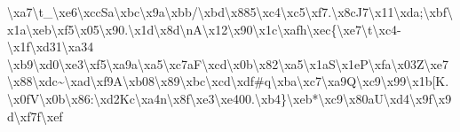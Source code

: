 \documentclass[11pt]{article}
\begin{document}
\textbackslash{}xa7\textbackslash{}t\_\textbackslash{}xe6\textbackslash{}xccSa\textbackslash{}xbc\textbackslash{}x9a\textbackslash{}xbb/\textbackslash{}xbd\textbackslash{}x885\textbackslash{}xc4\textbackslash{}xc5\textbackslash{}xf7.\textbackslash{}x8cJ7\textbackslash{}x11\textbackslash{}xda;\textbackslash{}xbf\textbackslash{}x1a\textbackslash{}xeb\textbackslash{}xf5\textbackslash{}x05\textbackslash{}x90.\textbackslash{}x1d\textbackslash{}x8d\textbackslash{}nA\textbackslash{}x12\textbackslash{}x90\textbackslash{}x1c\textbackslash{}xafh\textbackslash{}xec\{\textbackslash{}xe7\textbackslash{}t\textbackslash{}xc4-\textbackslash{}x1f\textbackslash{}xd31\textbackslash{}xa34 \textbackslash{}xb9\textbackslash{}xd0\textbackslash{}xe3\textbackslash{}xf5\textbackslash{}xa9a\textbackslash{}xa5\textbackslash{}xc7aF\textbackslash{}xcd\textbackslash{}x0b\textbackslash{}x82\textbackslash{}xa5\textbackslash{}x1aS\textbackslash{}x1eP\textbackslash{}xfa\textbackslash{}x03Z\textbackslash{}xe7\textbackslash{}x88\textbackslash{}xdc\textasciitilde{}\textbackslash{}xad\textbackslash{}xf9A\textbackslash{}xb08\textbackslash{}x89\textbackslash{}xbc\textbackslash{}xcd\textbackslash{}xdf\#q\textbackslash{}xba\textbackslash{}xc7\textbackslash{}xa9Q\textbackslash{}xc9\textbackslash{}x99\textbackslash{}x1b[K.\textbackslash{}x0fV\textbackslash{}x0b\textbackslash{}x86:\textbackslash{}xd2Kc\textbackslash{}xa4n\textbackslash{}x8f\textbackslash{}xe3\textbackslash{}xe400.\textbackslash{}xb4\}\textbackslash{}xeb*\textbackslash{}xc9\textbackslash{}x80aU\textbackslash{}xd4\textbackslash{}x9f\textbackslash{}x9d\textbackslash{}xf7f\textbackslash{}xef 
\end{document}
